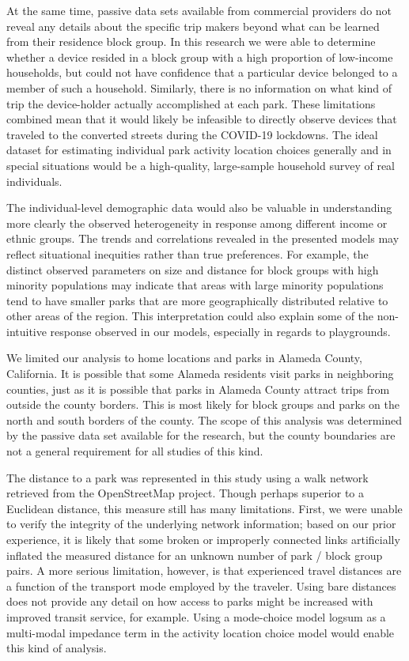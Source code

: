 \documentclass[3p, authoryear, review]{elsarticle} %
\begin{document}
At the same time, passive data sets available from commercial providers do not reveal any details about the specific trip makers beyond what can be learned from their residence block group. In this research we were able to determine whether a device resided in a block group with a high proportion of low-income households, but could not have confidence that a particular device belonged to a member of such a household. Similarly, there is no information on what kind of trip the device-holder actually accomplished at each park. These limitations combined mean that it would likely be infeasible to directly observe devices that traveled to the converted streets during the COVID-19 lockdowns. The ideal dataset for estimating individual park activity location choices generally and in special situations would be a high-quality, large-sample household survey of real individuals.

The individual-level demographic data would also be valuable in understanding more clearly the observed heterogeneity in response among different income or ethnic groups. The trends and correlations revealed in the presented models may reflect situational inequities rather than true preferences. For example, the distinct observed parameters on size and distance for block groups with high minority populations may indicate that areas with large minority populations tend to have smaller parks that are more geographically distributed relative to other areas of the region. This interpretation could also explain some of the non-intuitive response observed in our models, especially in regards to playgrounds.

We limited our analysis to home locations and parks in Alameda County, California. It is possible that some Alameda residents visit parks in neighboring counties, just as it is possible that parks in Alameda County attract trips from outside the county borders. This is most likely for block groups and parks on the north and south borders of the county. The scope of this analysis was determined by the passive data set available for the research, but the county boundaries are not a general requirement for all studies of this kind.

The distance to a park was represented in this study using a walk network retrieved from the OpenStreetMap project. Though perhaps superior to a Euclidean distance, this measure still has many limitations. First, we were unable to verify the integrity of the underlying network information; based on our prior experience, it is likely that some broken or improperly connected links artificially inflated the measured distance for an unknown number of park / block group pairs. A more serious limitation, however, is that experienced travel distances are a function of the transport mode employed by the traveler. Using bare distances does not provide any detail on how access to parks might be increased with improved transit service, for example. Using a mode-choice model logsum as a multi-modal impedance term in the activity location choice model would enable this kind of analysis.
\end{document}
